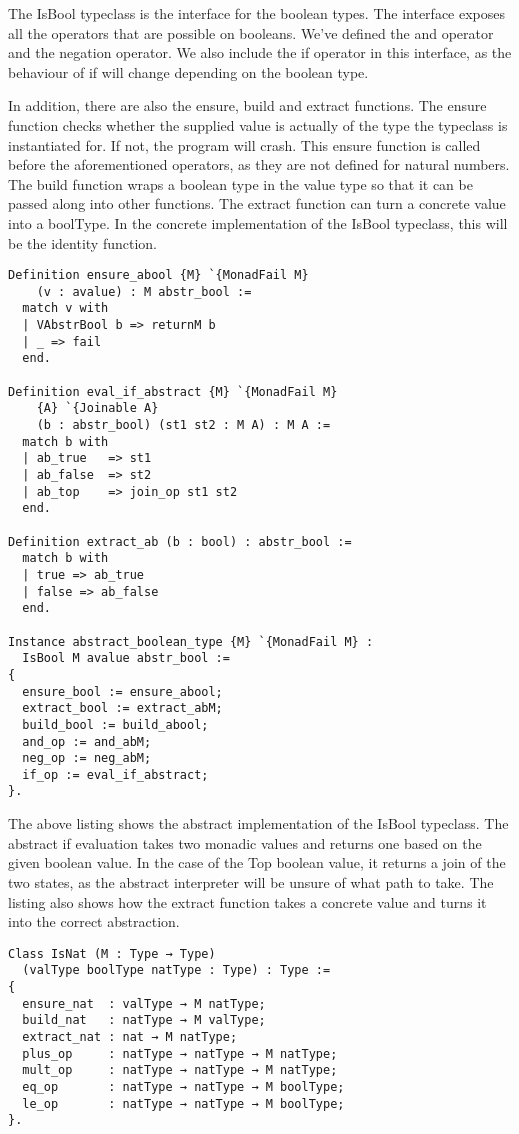 The IsBool typeclass is the interface for the boolean types. The interface
exposes all the operators that are possible on booleans. We've defined the and
operator and the negation operator. We also include the if operator in this
interface, as the behaviour of if will change depending on the boolean type. 

In addition, there are also the ensure, build and extract functions. The ensure
function checks whether the supplied value is actually of the type the
typeclass is instantiated for. If not, the program will crash. This ensure
function is called before the aforementioned operators, as they are not defined
for natural numbers. The build function wraps a boolean type in the value type
so that it can be passed along into other functions. The extract function can
turn a concrete value into a boolType. In the concrete implementation
of the IsBool typeclass, this will be the identity function.

\begin{verbatim}
Definition ensure_abool {M} `{MonadFail M} 
    (v : avalue) : M abstr_bool :=
  match v with
  | VAbstrBool b => returnM b
  | _ => fail
  end.

Definition eval_if_abstract {M} `{MonadFail M} 
    {A} `{Joinable A} 
    (b : abstr_bool) (st1 st2 : M A) : M A :=
  match b with
  | ab_true   => st1
  | ab_false  => st2
  | ab_top    => join_op st1 st2
  end.

Definition extract_ab (b : bool) : abstr_bool := 
  match b with
  | true => ab_true
  | false => ab_false
  end.

Instance abstract_boolean_type {M} `{MonadFail M} : 
  IsBool M avalue abstr_bool :=
{
  ensure_bool := ensure_abool;
  extract_bool := extract_abM;
  build_bool := build_abool;
  and_op := and_abM;
  neg_op := neg_abM;
  if_op := eval_if_abstract;
}.
\end{verbatim}

The above listing shows the abstract implementation of the IsBool typeclass.
The abstract if evaluation takes two monadic values and returns one based on the
given boolean value. In the case of the Top boolean value, it returns a join of
the two states, as the abstract interpreter will be unsure of what path to
take. The listing also shows how the extract function takes a concrete value
and turns it into the correct abstraction.

\begin{verbatim}
Class IsNat (M : Type → Type)
  (valType boolType natType : Type) : Type :=
{
  ensure_nat  : valType → M natType;
  build_nat   : natType → M valType;
  extract_nat : nat → M natType;
  plus_op     : natType → natType → M natType;
  mult_op     : natType → natType → M natType;
  eq_op       : natType → natType → M boolType;
  le_op       : natType → natType → M boolType;
}.
\end{verbatim}

